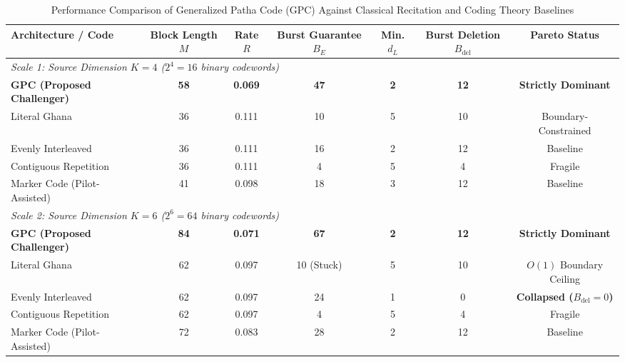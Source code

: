 
\begin{table}[t]
\centering
\caption{Performance Comparison of Generalized Patha Code (GPC) Against Classical Recitation and Coding Theory Baselines}
\label{tab:benchmark_comparison}
\begin{tabular}{lcccccc}
\hline
\textbf{Architecture / Code} & \textbf{Block Length $M$} & \textbf{Rate $R$} & \textbf{Burst Guarantee $B_E$} & \textbf{Min. $d_L$} & \textbf{Burst Deletion $B_{\text{del}}$} & \textbf{Pareto Status} \\
\hline
\multicolumn{7}{l}{\textit{Scale 1: Source Dimension $K = 4$ ($2^4 = 16$ binary codewords)}} \\
\textbf{GPC (Proposed Challenger)} & \textbf{58} & \textbf{0.069} & \textbf{47} & \textbf{2} & \textbf{12} & \textbf{Strictly Dominant} \\
Literal Ghana & 36 & 0.111 & 10 & 5 & 10 & Boundary-Constrained \\
Evenly Interleaved & 36 & 0.111 & 16 & 2 & 12 & Baseline \\
Contiguous Repetition & 36 & 0.111 & 4 & 5 & 4 & Fragile \\
Marker Code (Pilot-Assisted) & 41 & 0.098 & 18 & 3 & 12 & Baseline \\
\hline
\multicolumn{7}{l}{\textit{Scale 2: Source Dimension $K = 6$ ($2^6 = 64$ binary codewords)}} \\
\textbf{GPC (Proposed Challenger)} & \textbf{84} & \textbf{0.071} & \textbf{67} & \textbf{2} & \textbf{12} & \textbf{Strictly Dominant} \\
Literal Ghana & 62 & 0.097 & 10 (Stuck) & 5 & 10 & $O(1)$ Boundary Ceiling \\
Evenly Interleaved & 62 & 0.097 & 24 & 1 & 0 & \textbf{Collapsed ($B_{\text{del}}=0$)} \\
Contiguous Repetition & 62 & 0.097 & 4 & 5 & 4 & Fragile \\
Marker Code (Pilot-Assisted) & 72 & 0.083 & 28 & 2 & 12 & Baseline \\
\hline
\end{tabular}
\end{table}
